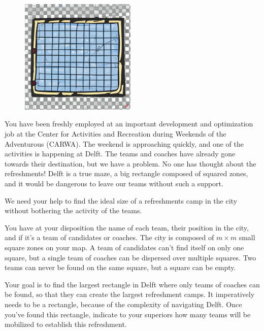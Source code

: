 \problemname{\problemyamlname}


\begin{figure}
    \centering
    \includegraphics[width=5.5cm]{ravitaillement.jpg}
\end{figure}

You have been freshly employed at an important development and optimization job at the Center for Activities and Recreation during Weekends of the Adventurous (CARWA).
The weekend is approaching quickly, and one of the activities is happening at Delft.
The teams and coaches have already gone towards their destination, but we have a problem.
No one has thought about the refreshments!
Delft is a true maze, a big rectangle composed of squared zones, and it would be dangerous to leave our teams without such a support.

We need your help to find the ideal size of a refreshments camp in the city without bothering the activity of the teams.

You have at your disposition the name of each team, their position in the city, and if it's a team of candidates or coaches.
The city is composed of $m \times m$ small square zones on your map.
A team of candidates can't find itself on only one square, but a single team of coaches can be dispersed over multiple squares.
Two teams can never be found on the same square, but a square can be empty.

Your goal is to find the largest rectangle in Delft where only teams of coaches can be found, so that they can create the largest refreshment camps.
It imperatively needs to be a rectangle, because of the complexity of navigating Delft.
Once you've found this rectangle, indicate to your superiors how many teams will be mobilized to establish this refreshment.

